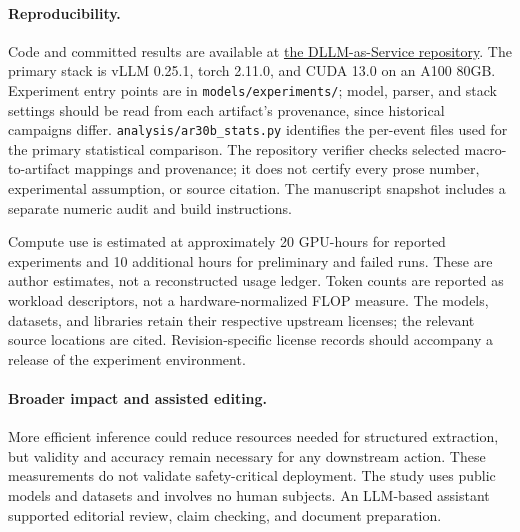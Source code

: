 \paragraph{Reproducibility.}
Code and committed results are available at
\href{https://github.com/AlexKay28/DLLM-as-Service}{the DLLM-as-Service repository}.
The primary stack is vLLM 0.25.1, torch 2.11.0, and CUDA 13.0 on an
A100 80GB. Experiment entry points are in
\texttt{models/experiments/}; model, parser, and stack settings should be
read from each artifact's provenance, since historical campaigns differ.
\texttt{analysis/ar30b\_stats.py} identifies the per-event files used
for the primary statistical comparison. The repository verifier checks
selected macro-to-artifact mappings and provenance; it does not certify
every prose number, experimental assumption, or source citation.
The manuscript snapshot includes a separate numeric audit and build instructions.

Compute use is estimated at approximately 20 GPU-hours for reported
experiments and 10 additional hours for preliminary and failed runs.
These are author estimates, not a reconstructed usage ledger. Token counts are
reported as workload descriptors, not a hardware-normalized FLOP measure.
The models, datasets, and libraries retain their respective upstream
licenses; the relevant source locations are cited. Revision-specific
license records should accompany a release of the experiment environment.

\paragraph{Broader impact and assisted editing.}
More efficient inference could reduce resources needed for structured
extraction, but validity and accuracy remain necessary for any downstream
action. These measurements do not validate safety-critical deployment.
The study uses public models and datasets and involves no human subjects.
An LLM-based assistant supported editorial review, claim checking,
and document preparation.
